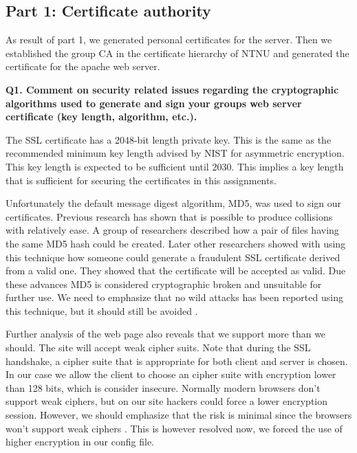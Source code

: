 
\subsection {Part 1: Certificate authority}

As result of part 1, we generated personal certificates for the server. Then we established the group CA in the certificate hierarchy of NTNU and generated the certificate for the apache web server. 
\newline

\noindent
{\bf Q1. Comment on security related issues regarding the cryptographic algorithms used to generate and sign your groups web server certificate (key length, algorithm, etc.).}
\newline

\noindent
The SSL certificate has a 2048-bit length private key. This is the same as the recommended minimum key length advised by NIST for asymmetric encryption. This key length is expected to be sufficient until 2030\cite{nisc}. This implies a key length that is sufficient for securing the certificates in this assignments. 
\newline

\noindent
Unfortunately the default message digest algorithm, MD5, was used to sign our certificates. Previous research has shown that is possible to produce collisions with relatively ease. A group of researchers described how a pair of files having the same MD5 hash could be created. Later other researchers showed with using this technique how someone could generate a fraudulent SSL certificate derived from a valid one. They showed that the certificate will be accepted as valid. Due these advances MD5 is considered cryptographic broken and unsuitable for further use. We need to emphasize that no wild attacks has been reported using this technique, but it should still be avoided \cite {md5Wiki, md5Networking}.
\newline

\noindent
Further analysis of the web page also reveals that we support more than we should. The site will accept weak cipher suits. Note that during the SSL handshake, a cipher suite that is appropriate for both client and server is chosen. In our case we allow the client to choose an cipher suite with encryption lower than 128 bits, which is consider insecure. Normally modern browsers don't support weak ciphers, but on our site hackers could force a lower encryption session. However, we should emphasize that the risk is minimal since the browsers won't support weak ciphers \cite {cipher}. This is however resolved now, we forced the use of higher encryption in our config file. 
\newline

  






